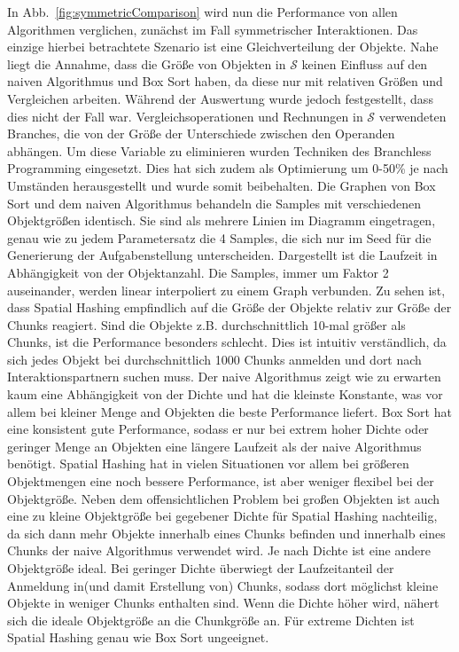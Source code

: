 In Abb.~\ref{fig:symmetricComparison} wird nun die Performance von allen Algorithmen verglichen, zunächst im Fall symmetrischer Interaktionen. Das einzige hierbei betrachtete Szenario ist eine Gleichverteilung der Objekte. Nahe liegt die Annahme, dass die Größe von Objekten in $\mathcal{S}$
 keinen Einfluss auf den naiven Algorithmus und Box Sort haben, da diese nur mit relativen Größen und Vergleichen arbeiten. Während der Auswertung wurde jedoch festgestellt, dass dies nicht der Fall war. Vergleichsoperationen und Rechnungen in $\mathcal{S}$
 verwendeten Branches, die von der Größe der Unterschiede zwischen den Operanden abhängen. Um diese Variable zu eliminieren wurden Techniken des Branchless Programming eingesetzt. Dies hat sich zudem als Optimierung um 0-50\% je nach Umständen herausgestellt und wurde somit beibehalten. Die Graphen von Box Sort und dem naiven Algorithmus behandeln die Samples mit verschiedenen Objektgrößen identisch. Sie sind als mehrere Linien im Diagramm eingetragen, genau wie zu jedem Parametersatz die 4 Samples, die sich nur im Seed für die Generierung der Aufgabenstellung unterscheiden. Dargestellt ist die Laufzeit in Abhängigkeit von der Objektanzahl. Die Samples, immer um Faktor 2 auseinander, werden linear interpoliert zu einem Graph verbunden. Zu sehen ist, dass Spatial Hashing empfindlich auf die Größe der Objekte relativ zur Größe der Chunks reagiert. Sind die Objekte z.B. durchschnittlich 10-mal größer als Chunks, ist die Performance besonders schlecht. Dies ist intuitiv verständlich, da sich jedes Objekt bei durchschnittlich 1000 Chunks anmelden und dort nach Interaktionspartnern suchen muss. Der naive Algorithmus zeigt wie zu erwarten kaum eine Abhängigkeit von der Dichte und hat die kleinste Konstante, was vor allem bei kleiner Menge and Objekten die beste Performance liefert. Box Sort hat eine konsistent gute Performance, sodass er nur bei extrem hoher Dichte oder geringer Menge an Objekten eine längere Laufzeit als der naive Algorithmus benötigt. Spatial Hashing hat in vielen Situationen vor allem bei größeren Objektmengen eine noch bessere Performance, ist aber weniger flexibel bei der Objektgröße. Neben dem offensichtlichen Problem bei großen Objekten ist auch eine zu kleine Objektgröße bei gegebener Dichte für Spatial Hashing nachteilig, da sich dann mehr Objekte innerhalb eines Chunks befinden und innerhalb eines Chunks der naive Algorithmus verwendet wird. Je nach Dichte ist eine andere Objektgröße ideal. Bei geringer Dichte überwiegt der Laufzeitanteil der Anmeldung in(und damit Erstellung von) Chunks, sodass dort möglichst kleine Objekte in weniger Chunks enthalten sind. Wenn die Dichte höher wird, nähert sich die ideale Objektgröße an die Chunkgröße an. Für extreme Dichten ist Spatial Hashing genau wie Box Sort ungeeignet.\\


